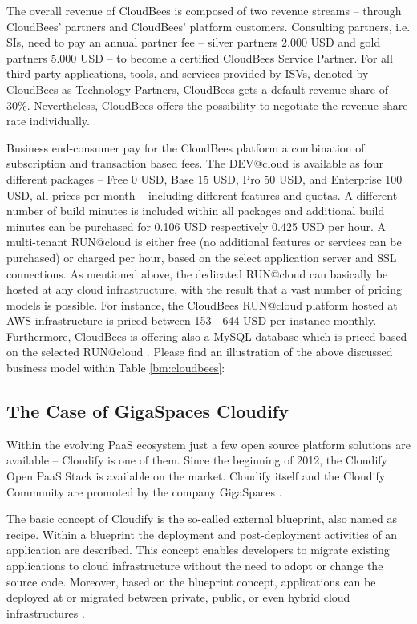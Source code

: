 The overall revenue of CloudBees is composed of two revenue streams -- through CloudBees' partners and CloudBees' platform customers. Consulting partners, i.e. \acp{SI}, need to pay an annual partner fee -- silver partners 2.000 \ac{USD} and gold partners 5.000 \ac{USD} -- to become a certified CloudBees Service Partner. For all third-party applications, tools, and services provided by \acp{ISV}, denoted by CloudBees as Technology Partners, CloudBees gets a default revenue share of 30\%. Nevertheless, CloudBees offers the possibility to negotiate the revenue share rate individually.

Business end-consumer pay for the CloudBees platform a combination of subscription and transaction based fees. The DEV@cloud is available as four different packages -- Free 0 \ac{USD}, Base 15 \ac{USD}, Pro 50 \ac{USD}, and Enterprise 100 \ac{USD}, all prices per month -- including different features and quotas. A different number of build minutes is included within all packages and additional build minutes can be purchased for 0.106 \ac{USD} respectively 0.425 \ac{USD} per hour. A multi-tenant RUN@cloud is either free (no additional features or services can be purchased) or charged per hour, based on the select application server and SSL connections. As mentioned above, the dedicated RUN@cloud can basically be hosted at any cloud infrastructure, with the result that a vast number of pricing models is possible. For instance, the CloudBees RUN@cloud platform hosted at \ac{AWS} infrastructure is priced between 153 - 644 \ac{USD} per instance monthly. Furthermore, CloudBees is offering also a MySQL database which is priced based on the selected RUN@cloud \citep{CloudBees2013}. Please find an illustration of the above discussed business model within Table \ref{bm:cloudbees}:



\subsection{The Case of GigaSpaces Cloudify}\label{ch:sota:gsc}

Within the evolving \ac{PaaS} ecosystem just a few open source platform solutions are available -- Cloudify is one of them. Since the beginning of 2012, the Cloudify Open \ac{PaaS} Stack is available on the market. Cloudify itself and the Cloudify Community are promoted by the company GigaSpaces \citep{GigaSpaces2013a}.

The basic concept of Cloudify is the so-called external blueprint, also named as recipe. Within a blueprint the deployment and post-deployment activities of an application are described. This concept enables developers to migrate existing applications to cloud infrastructure without the need to adopt or change the source code. Moreover, based on the blueprint concept, applications can be deployed at or migrated between private, public, or even hybrid cloud infrastructures \citep{GigaSpaces2013a}.

